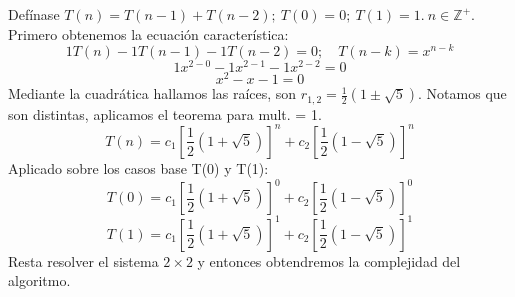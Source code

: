 \begin{example}
	Defínase $T(n)=T(n-1)+T(n-2);~ T(0)=0;~ T(1)=1.~ n\in\mathbb{Z}^+$.\\
	Primero obtenemos la ecuación característica:
	$$ 1T(n)-1T(n-1)-1T(n-2)=0;\quad T(n-k)=x^{n-k} $$
	$$ 1x^{2-0}-1x^{2-1}-1x^{2-2}=0 $$
	$$ x^2-x-1=0 $$
	Mediante la cuadrática hallamos las raíces, son $r_{1,2}=\frac12(1\pm\sqrt5)$. Notamos que son distintas, aplicamos el teorema para mult. = 1.
	$$ T(n)=c_1[\frac12(1+\sqrt5)]^n+c_2[\frac12(1-\sqrt5)]^n $$
	Aplicado sobre los casos base T(0) y T(1):
	$$ T(0)=c_1[\frac12(1+\sqrt5)]^0+c_2[\frac12(1-\sqrt5)]^0 $$
	$$ T(1)=c_1[\frac12(1+\sqrt5)]^1+c_2[\frac12(1-\sqrt5)]^1 $$
	Resta resolver el sistema $2\times2$ y entonces obtendremos la complejidad del algoritmo.
\end{example}